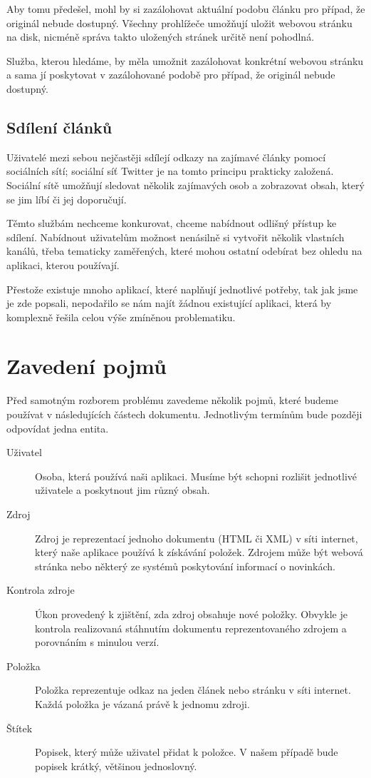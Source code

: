 Aby tomu předešel, mohl by si zazálohovat aktuální podobu článku pro případ, že originál nebude dostupný.
Všechny prohlížeče umožňují uložit webovou stránku na disk, nicméně správa takto uložených stránek určitě není pohodlná.

Služba, kterou hledáme, by měla umožnit zazálohovat konkrétní webovou stránku a sama jí poskytovat v zazálohované podobě pro případ, že originál nebude dostupný.

\subsection{Sdílení článků}

Uživatelé mezi sebou nejčastěji sdílejí odkazy na zajímavé články pomocí sociálních sítí; sociální síť Twitter je na tomto principu prakticky založená.
Sociální sítě umožňují sledovat několik zajímavých osob a zobrazovat obsah, který se jim líbí či jej doporučují.

Těmto službám nechceme konkurovat, chceme nabídnout odlišný přístup ke sdílení.
Nabídnout uživatelům možnost nenásilně si vytvořit několik vlastních kanálů, třeba tematicky zaměřených, které mohou ostatní odebírat bez ohledu na aplikaci, kterou používají.

\bigskip

Přestože existuje mnoho aplikací, které naplňují jednotlivé potřeby, tak jak jsme je zde popsali, nepodařilo se nám najít žádnou existující aplikaci, která by komplexně řešila celou výše zmíněnou problematiku.

\section{Zavedení pojmů}

Před samotným rozborem problému zavedeme několik pojmů, které budeme používat v následujících částech dokumentu.
Jednotlivým termínům bude později odpovídat jedna entita.

\begin{description}
    \item[Uživatel] Osoba, která používá naši aplikaci.
		Musíme být schopni rozlišit jednotlivé uživatele a poskytnout jim různý obsah.
    \item[Zdroj] Zdroj je reprezentací jednoho dokumentu (HTML či XML) v síti internet, který naše aplikace používá k získávání položek.
		Zdrojem může být webová stránka nebo některý ze systémů poskytování informací o novinkách.
	\item[Kontrola zdroje] Úkon provedený k zjištění, zda zdroj obsahuje nové položky.
		Obvykle je kontrola realizovaná stáhnutím dokumentu reprezentovaného zdrojem a porovnáním s minulou verzí.
    \item[Položka] Položka reprezentuje odkaz na jeden článek nebo stránku v síti internet.
		Každá položka je vázaná právě k jednomu zdroji.
    \item[Štítek] Popisek, který může uživatel přidat k položce.
		V našem případě bude popisek krátký, většinou jednoslovný.
\end{description}

